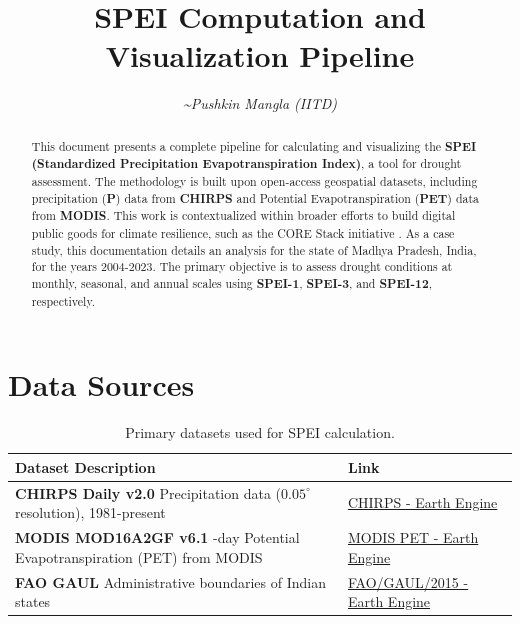 \documentclass[12pt, a4paper]{article}
\title{\huge\textbf{SPEI Computation and Visualization Pipeline}}
\author{\large\textit{\textasciitilde Pushkin Mangla (IITD)}}
\date{}
\begin{document}
\maketitle
\tableofcontents
\newpage

\begin{abstract}
    \noindent This document presents a complete pipeline for calculating and visualizing the \textbf{SPEI (Standardized Precipitation Evapotranspiration Index)}, a tool for drought assessment. The methodology is built upon open-access geospatial datasets, including precipitation (\textbf{P}) data from \textbf{CHIRPS} and Potential Evapotranspiration (\textbf{PET}) data from \textbf{MODIS}. This work is contextualized within broader efforts to build digital public goods for climate resilience, such as the CORE Stack initiative \cite{seth2024core}.
    \newline\newline
    As a case study, this documentation details an analysis for the state of Madhya Pradesh, India, for the years 2004-2023. The primary objective is to assess drought conditions at monthly, seasonal, and annual scales using \textbf{SPEI-1}, \textbf{SPEI-3}, and \textbf{SPEI-12}, respectively.
\end{abstract}

\section{Data Sources}

\begin{table}[h!]
    \centering
    \caption{Primary datasets used for SPEI calculation.}
    \begin{tabular}{p{6cm} p{6cm}}
        \toprule
        \textbf{Dataset Description} & \textbf{Link} \\
        \midrule
        \textbf{CHIRPS Daily v2.0} \newline Precipitation data ($0.05^{\circ}$ resolution), 1981-present & \href{https://developers.google.com/earth-engine/datasets/catalog/UCSB-CHG_CHIRPS_DAILY}{CHIRPS - Earth Engine} \\
        \addlinespace
        \textbf{MODIS MOD16A2GF v6.1} \newline 8-day Potential Evapotranspiration (PET) from MODIS & \href{https://developers.google.com/earth-engine/datasets/catalog/MODIS_061_MOD16A2GF}{MODIS PET - Earth Engine} \\
        \addlinespace
        \textbf{FAO GAUL} \newline Administrative boundaries of Indian states & \href{https://developers.google.com/earth-engine/datasets/catalog/FAO_GAUL_2015_level1}{FAO/GAUL/2015 - Earth Engine} \\
        \bottomrule
    \end{tabular}
\end{table}
\end{document}
